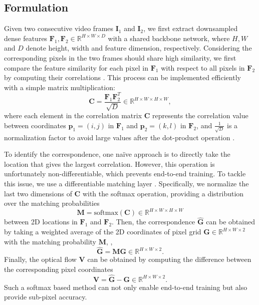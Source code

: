 \documentclass[10pt,twocolumn,letterpaper]{article}
\begin{document}
\subsection{Formulation}
\label{sec:formulation}
Given two consecutive video frames ${\bm I}_1$ and ${\bm I}_2$, we first extract downsampled dense features ${\bm F}_1, {\bm F}_2 \in \mathbb{R}^{H \times W \times D}$ with a shared backbone network, where $H, W$ and $D$ denote height, width and feature dimension, respectively. Considering the corresponding pixels in the two frames should share high similarity, we first compare the feature similarity for each pixel in ${\bm F}_1$ with respect to all pixels in ${\bm F}_2$ by computing their correlations \cite{wang2020learning}. This process can be implemented efficiently with a simple matrix multiplication:
\begin{equation}
    {\bm C} =  \frac{{\bm F}_1 {\bm F}_2^T}{\sqrt{D}}  \in \mathbb{R}^{H \times W \times H \times W}, 
\end{equation}
where each element in the correlation matrix ${\bm C}$ represents the correlation value between coordinates ${\bm p}_1 = (i, j)$ in ${\bm F}_1$ and ${\bm p}_2 = (k, l)$ in ${\bm F}_2$, and $\frac{1}{\sqrt{D}}$ is a normalization factor to avoid large values after the dot-product operation \cite{vaswani2017attention}.

To identify the correspondence, one na\"ive approach is to directly take the location that gives the largest correlation. However, this operation is unfortunately non-differentiable, which prevents end-to-end training. To tackle this issue, we use a differentiable matching layer \cite{wang2020learning,kendall2017end,xu2020aanet}. Specifically, we normalize the last two dimensions of ${\bm C}$ with the softmax operation, providing a distribution over the matching probabilities 
\begin{equation}
    {\bm M} = \mathrm{softmax} ({\bm C}) \in \mathbb{R}^{H \times W \times H \times W}
\end{equation}
between 2D locations in ${\bm F}_1$ and ${\bm F}_2$. Then, the correspondence $\hat{{\bm G}}$ can be obtained by taking a weighted average of the 2D coordinates of pixel grid ${\bm G} \in \mathbb{R}^{H \times W \times 2}$ with the matching probability ${\bm M}$, \ie,
\begin{equation}
    \hat{{\bm G}} = {\bm M} {\bm G} \in \mathbb{R}^{H \times W \times 2}.
\end{equation}
Finally, the optical flow ${\bm V}$ can be obtained by computing the difference between the corresponding pixel coordinates
\begin{equation}
{\bm V} = \hat{{\bm G}}  - {\bm G} \in \mathbb{R}^{H \times W \times 2}.
\end{equation}
Such a softmax based method can not only enable end-to-end training but also provide sub-pixel accuracy. 
\end{document}
